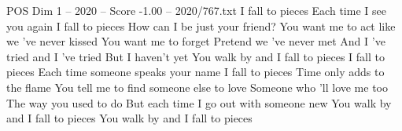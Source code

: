 \begin{textsample}{POS Dim 1 – 2020 – Score -1.00 – 2020/767.txt}  \label{ex:f1_pos_017}
I fall to pieces Each time I see you again I fall to pieces How can I be just your friend?
You want me to act like we 've never kissed You want me to forget Pretend we 've never met And I 've tried and I 've tried But I haven't yet You walk by and I fall to pieces I fall to pieces Each time someone speaks your name I fall to pieces Time only adds to the flame You tell me to find someone else to love Someone who 'll love me too The way you used to do But each time I go out with someone new You walk by and I fall to pieces You walk by and I fall to pieces

\end{textsample}

